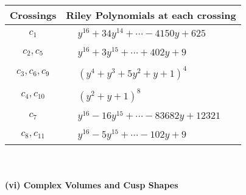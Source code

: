 \documentclass[1p]{elsarticle_modified}
\theoremstyle{definition}
\begin{document}
\begin{tabular}{m{50pt}|m{274pt}}
Crossings & \hspace{64pt}Riley Polynomials at each crossing \\
\hline $$\begin{aligned}c_{1}\end{aligned}$$&$\begin{aligned}
&y^{16}+34 y^{14}+\cdots-4150 y+625
\end{aligned}$\\
\hline $$\begin{aligned}c_{2},c_{5}\end{aligned}$$&$\begin{aligned}
&y^{16}+3 y^{15}+\cdots+402 y+9
\end{aligned}$\\
\hline $$\begin{aligned}c_{3},c_{6},c_{9}\end{aligned}$$&$\begin{aligned}
&(y^4+y^3+5 y^2+y+1)^4
\end{aligned}$\\
\hline $$\begin{aligned}c_{4},c_{10}\end{aligned}$$&$\begin{aligned}
&(y^2+y+1)^8
\end{aligned}$\\
\hline $$\begin{aligned}c_{7}\end{aligned}$$&$\begin{aligned}
&y^{16}-16 y^{15}+\cdots-83682 y+12321
\end{aligned}$\\
\hline $$\begin{aligned}c_{8},c_{11}\end{aligned}$$&$\begin{aligned}
&y^{16}-5 y^{15}+\cdots-102 y+9
\end{aligned}$\\
\hline
\end{tabular}\\~\\
\newpage\flushleft \textbf{(vi) Complex Volumes and Cusp Shapes}
\end{document}
